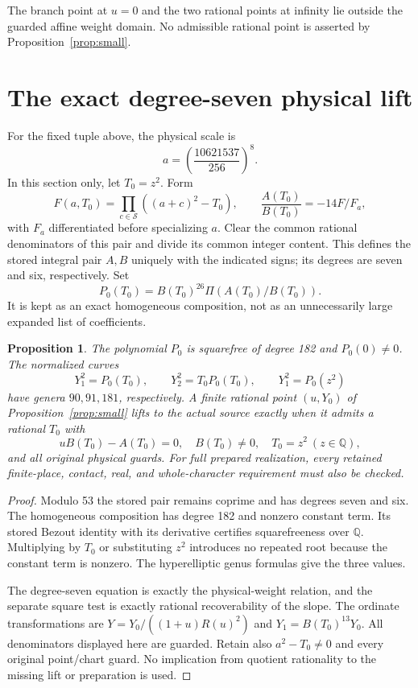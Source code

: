\documentclass[11pt,a4paper]{article}
\newtheorem{proposition}[theorem]{Proposition}
\newcommand{\Q}{\mathbb Q}\newcommand{\Z}{\mathbb Z}
\begin{document}
The branch point at $u=0$ and the two rational points at infinity lie
outside the guarded affine weight domain. No admissible rational point
is asserted by Proposition~\ref{prop:small}.

\section{The exact degree-seven physical lift}
For the fixed tuple above, the physical scale is
\[
                a=\left(\frac{10621537}{256}\right)^8.
\]
In this section only, let $T_0=z^2$. Form
\[
 F(a,T_0)=\prod_{c\in\mathcal S}((a+c)^2-T_0),\qquad
                   \frac{A(T_0)}{B(T_0)}=-14F/F_a,
\]
with $F_a$ differentiated before specializing $a$. Clear the common
rational denominators of this pair and divide its common integer
content. This defines the stored integral pair $A,B$ uniquely with
the indicated signs; its degrees are seven and six, respectively.
Set
\[
                P_0(T_0)=B(T_0)^{26}\Pi(A(T_0)/B(T_0)).
\]
It is kept as an exact homogeneous composition, not as an unnecessarily
large expanded list of coefficients.

\begin{proposition}\label{prop:physical}
The polynomial $P_0$ is squarefree of degree 182 and $P_0(0)\ne0$.
The normalized curves
\[
 Y_1^2=P_0(T_0),\qquad Y_2^2=T_0P_0(T_0),\qquad
                         Y_1^2=P_0(z^2)
\]
have genera $90,91,181$, respectively. A finite rational point
$(u,Y_0)$ of Proposition~\ref{prop:small} lifts to the actual source
exactly when it admits a rational $T_0$ with
\[
 uB(T_0)-A(T_0)=0,\quad B(T_0)\ne0,\quad
 T_0=z^2\ (z\in\Q),
\]
and all original physical guards. For full prepared realization, every
retained finite-place, contact, real, and whole-character requirement
must also be checked.
\end{proposition}
\begin{proof}
Modulo 53 the stored pair remains coprime and has degrees seven and
six. The homogeneous composition has degree 182 and nonzero constant
term. Its stored Bezout identity with its derivative certifies
squarefreeness over $\Q$. Multiplying by $T_0$ or substituting $z^2$
introduces no repeated root because the constant term is nonzero.
The hyperelliptic genus formulas give the three values.

The degree-seven equation is exactly the physical-weight relation,
and the separate square test is exactly rational recoverability of the
slope. The ordinate transformations are
$Y=Y_0/((1+u)R(u)^2)$ and $Y_1=B(T_0)^{13}Y_0$.
All denominators displayed here are guarded. Retain also
$a^2-T_0\ne0$ and every original point/chart guard. No implication
from quotient rationality to the missing lift or preparation is used.
\end{proof}
\end{document}
